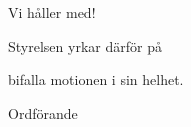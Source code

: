 \documentclass[../_main/handlingar.tex]{subfiles}
\begin{document}
\motionssvar
Vi håller med!

Styrelsen yrkar därför på

\begin{attsatser}
    \att bifalla motionen i sin helhet.
\end{attsatser}


\begin{signatures}{1}
	\ist
	\signature{Daniel Bakic}{Ordförande}
\end{signatures}
\end{document}
